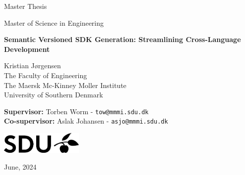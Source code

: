 \begin{titlepage}
    \centering

    \vspace*{1cm}
    {
    \Huge
    Master Thesis
    
    \vspace*{0.2cm}
    \Large
    Master of Science in Engineering
    }
    
    \vspace*{2cm}

    \linespread{2.0}
    \huge\textbf{
        Semantic Versioned SDK Generation:
        Streamlining Cross-Language Development
    }
    \normalsize
    \linespread{1.0}

    \vspace{2,5cm}

    \linespread{1.2}
    \Large
    Kristian Jørgensen \\
    \large
    The Faculty of Engineering \\ 
    The Maersk Mc-Kinney Moller Institute \\ 
    University of Southern Denmark \\
    \normalsize
    \linespread{1.0}

    \vspace{1,5cm}

    \textbf{Supervisor:} Torben Worm - \texttt{tow@mmmi.sdu.dk} \\
    \textbf{Co-supervisor:} Aslak Johansen - \texttt{asjo@mmmi.sdu.dk}

    \vspace{1cm}
    \includegraphics[width=0.3\textwidth]{figures/assets/sdu.png}

    \vspace{1cm}
    June, 2024
\end{titlepage}
